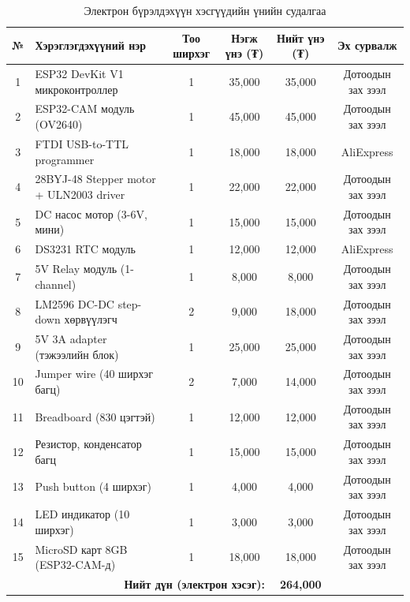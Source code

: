 \documentclass[12pt,a4paper]{report}
\begin{document}
\begin{table}[H]
\centering
\scriptsize
\caption{Электрон бүрэлдэхүүн хэсгүүдийн үнийн судалгаа}
\label{tab:price-electronics}
\begin{tabularx}{\textwidth}{|c|X|c|c|c|c|}
\hline
\textbf{№} & \textbf{Хэрэглэгдэхүүний нэр} & \textbf{Тоо ширхэг} & \textbf{Нэгж үнэ (₮)} & \textbf{Нийт үнэ (₮)} & \textbf{Эх сурвалж} \\ \hline
1  & ESP32 DevKit V1 микроконтроллер        & 1 & 35{,}000  & 35{,}000  & Дотоодын зах зээл \\ \hline
2  & ESP32-CAM модуль (OV2640)              & 1 & 45{,}000  & 45{,}000  & Дотоодын зах зээл \\ \hline
3  & FTDI USB-to-TTL programmer             & 1 & 18{,}000  & 18{,}000  & AliExpress \\ \hline
4  & 28BYJ-48 Stepper motor + ULN2003 driver& 1 & 22{,}000  & 22{,}000  & Дотоодын зах зээл \\ \hline
5  & DC насос мотор (3-6V, мини)            & 1 & 15{,}000  & 15{,}000  & Дотоодын зах зээл \\ \hline
6  & DS3231 RTC модуль                      & 1 & 12{,}000  & 12{,}000  & AliExpress \\ \hline
7  & 5V Relay модуль (1-channel)            & 1 & 8{,}000   & 8{,}000   & Дотоодын зах зээл \\ \hline
8  & LM2596 DC-DC step-down хөрвүүлэгч      & 2 & 9{,}000   & 18{,}000  & Дотоодын зах зээл \\ \hline
9  & 5V 3A adapter (тэжээлийн блок)         & 1 & 25{,}000  & 25{,}000  & Дотоодын зах зээл \\ \hline
10 & Jumper wire (40 ширхэг багц)           & 2 & 7{,}000   & 14{,}000  & Дотоодын зах зээл \\ \hline
11 & Breadboard (830 цэгтэй)                & 1 & 12{,}000  & 12{,}000  & Дотоодын зах зээл \\ \hline
12 & Резистор, конденсатор багц             & 1 & 15{,}000  & 15{,}000  & Дотоодын зах зээл \\ \hline
13 & Push button (4 ширхэг)                 & 1 & 4{,}000   & 4{,}000   & Дотоодын зах зээл \\ \hline
14 & LED индикатор (10 ширхэг)              & 1 & 3{,}000   & 3{,}000   & Дотоодын зах зээл \\ \hline
15 & MicroSD карт 8GB (ESP32-CAM-д)         & 1 & 18{,}000  & 18{,}000  & Дотоодын зах зээл \\ \hline
\multicolumn{4}{|r|}{\textbf{Нийт дүн (электрон хэсэг):}} & \textbf{264{,}000} & \\ \hline
\end{tabularx}
\end{table}
\end{document}
